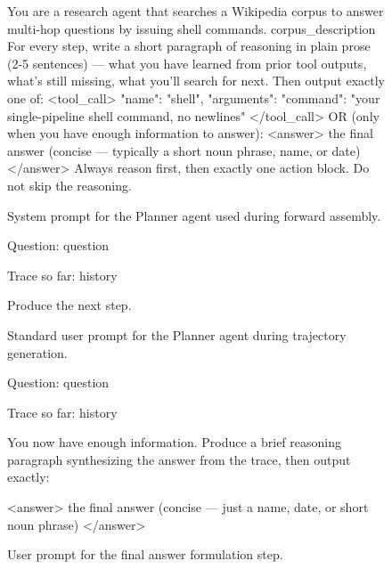\documentclass{llmxive}
\begin{document}

\begin{figure}[!t]
\begin{promptbox}
You are a research agent that searches a Wikipedia corpus to answer multi-hop questions by issuing shell commands.
{corpus_description}
For every step, write a short paragraph of reasoning in plain prose (2-5 sentences) — what you have learned from prior tool outputs, what's still missing, what you'll search for next. Then output exactly one of:
<tool_call>
{{"name": "shell", "arguments": {{"command": "your single-pipeline shell command, no newlines"}}}}
</tool_call>
OR (only when you have enough information to answer):
<answer>
the final answer (concise — typically a short noun phrase, name, or date)
</answer>
Always reason first, then exactly one action block. Do not skip the reasoning.
\end{promptbox}
\vspace{-0.4cm}
\caption{System prompt for the Planner agent used during forward assembly.}
\label{fig:prompt_planner_system}
\end{figure}

\begin{figure}[!t]
\begin{promptbox}
Question: {question}

Trace so far:
{history}

Produce the next step.
\end{promptbox}
\vspace{-0.4cm}
\caption{Standard user prompt for the Planner agent during trajectory generation.}
\label{fig:prompt_planner_step}
\end{figure}

\begin{figure}[!t]
\begin{promptbox}
Question: {question}

Trace so far:
{history}

You now have enough information. Produce a brief reasoning paragraph synthesizing the answer from the trace, then output exactly:

<answer>
the final answer (concise — just a name, date, or short noun phrase)
</answer>
\end{promptbox}
\vspace{-0.4cm}
\caption{User prompt for the final answer formulation step.}
\label{fig:prompt_final_answer}
\end{figure}
\end{document}
